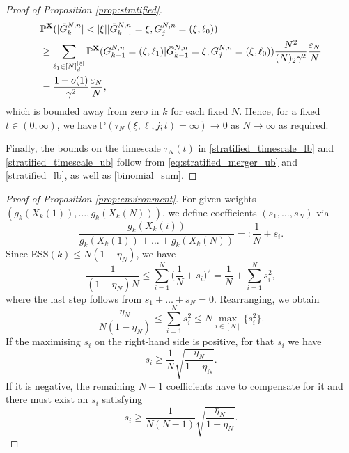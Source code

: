 \documentclass[a4paper,11pt]{article}
\theoremstyle{definition}
\newcommand{\bbP}{\mathbb{P}}
\newcommand{\bfX}{\mathbf{X}}
\begin{document}
\begin{proof}[Proof of Proposition \ref{prop:stratified}]
\begin{align}
&\bbP^{ \bfX }( | \bar{ G }_k^{ N, n } | < | \xi | | \bar{ G }_{ k - 1 }^{ N, n } = \xi, G_j^{ N, n } = ( \xi, \ell_0 ) ) \notag \\
&\geq \sum_{ \ell_1 \in [ N ]_d^{ | \xi | } } \bbP^{ \bfX }( G_{ k - 1 }^{ N, n } = ( \xi, \ell_1 ) | \bar{ G }_{ k - 1 }^{ N, n } = \xi, G_j^{ N, n } = ( \xi, \ell_0 ) ) \frac{ N^2 }{ ( N )_2 \gamma^2 } \frac{\varepsilon_N}{N} \notag \\
&= \frac{ 1 + o( 1 ) }{ \gamma^2 } \frac{\varepsilon_N}{N}, \label{stratified_lb}
\end{align}
which is bounded away from zero in $k$ for each fixed $N$.
Hence, for a fixed $t \in (0, \infty)$, we have $\bbP( \tau_N( \xi, \ell, j; t ) = \infty ) \to 0$ as $N \to \infty$ as required.

Finally, the bounds on the timescale $\tau_N(t)$ in \eqref{stratified_timescale_lb} and \eqref{stratified_timescale_ub} follow from \eqref{eq:stratified_merger_ub} and \eqref{stratified_lb}, as well as \eqref{binomial_sum}.
\end{proof}

\begin{proof}[Proof of Proposition \ref{prop:environment}]
For given weights $(g_k(X_k(1)), \ldots, g_k(X_k(N)))$, we define coefficients $(s_1, \ldots, s_N)$ via
\begin{equation*}
\frac{g_k(X_k(i))}{g_k(X_k(1)) + \ldots + g_k(X_k(N))} =: \frac{1}{N} + s_i.
\end{equation*}
Since ESS$(k) \leq N (1 - \eta_N)$, we have
\begin{equation*}
\frac{1}{(1 - \eta_N) N} \leq \sum_{i = 1}^N \Big(\frac{1}{N} + s_i \Big)^2 = \frac{1}{N} + \sum_{i = 1}^N s_i^2,
\end{equation*}
where the last step follows from $s_1 + \ldots + s_N = 0$.
Rearranging, we obtain
\begin{equation*}
\frac{\eta_N}{N (1 - \eta_N)} \leq \sum_{i = 1}^N s_i^2 \leq N \max_{i \in [N]}\{s_i^2\}.
\end{equation*}
If the maximising $s_i$ on the right-hand side is positive, for that $s_i$ we have
\begin{equation*}
s_i \geq \frac{1}{N} \sqrt{\frac{\eta_N}{1 - \eta_N}}.
\end{equation*}
If it is negative, the remaining $N - 1$ coefficients have to compensate for it and there must exist an $s_i$ satisfying
\begin{equation*}
s_i \geq \frac{1}{N(N - 1)} \sqrt{\frac{\eta_N}{1 - \eta_N}}.
\end{equation*}
\end{proof}
\end{document}
